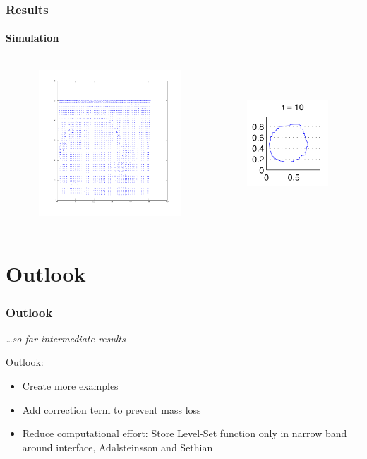 \documentclass[ucs]{beamer}
\begin{document}
\begin{frame}
\frametitle{Results}
\framesubtitle{Simulation}
\begin{tabular}{l l}
\begin{minipage}{0.5\textwidth}
\begin{figure}[h!]
\includegraphics[width=7cm]{plots/vel10.png}
\end{figure}
\end{minipage}
&
\begin{minipage}{0.5\textwidth}
\begin{figure}[h!]
  \includegraphics[width=4cm]{plots/interface_t10.png}
\end{figure}
\end{minipage}
\end{tabular}
\end{frame}

\section{Outlook}
\begin{frame}
\frametitle{Outlook}
\textit{\dots so far intermediate results}

\vspace{.8cm} 
Outlook:
\begin{itemize}
\item<1-> Create more examples
\item<2-> Add correction term to prevent mass loss
\item<3-> Reduce computational effort: Store Level-Set function only in narrow band around interface, Adalsteinsson and Sethian
\end{itemize}

\end{frame}
\end{document}
